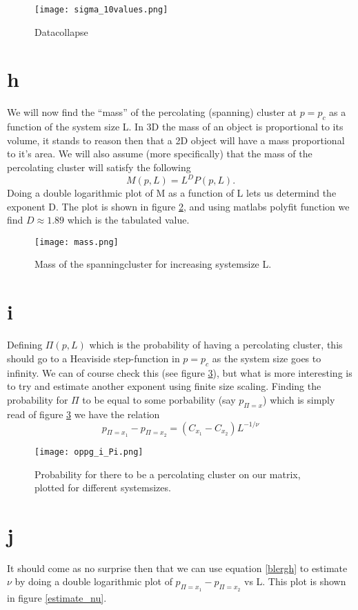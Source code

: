 \documentclass[a4paper,english, 10pt, twoside]{article}
\begin{document}
\begin{figure}[H]
 \centering
 \texttt{[image: sigma\_10values.png]}
 \caption{Datacollapse}
 \label{sigma}
\end{figure}

\section{h}
We will now find the ``mass'' of the percolating (spanning) cluster at $p = p_c$ as a function of the system size L. 
In 3D the mass of an object is proportional to its volume, it stands to reason then that a 2D object will have a mass 
proportional to it's area. We will also assume (more specifically) that the mass of the percolating cluster will 
satisfy the following
$$
M(p,L) = L^D P(p,L).
$$
Doing a double logarithmic plot of M as a function of L lets us determind the exponent D. The plot is shown in 
figure \ref{mass_D}, and using matlabs polyfit function we find $D \approx 1.89$ which is the tabulated value.
\begin{figure}[H]
 \centering
 \texttt{[image: mass.png]}
 \caption{Mass of the spanningcluster for increasing systemsize L.}
 \label{mass_D}
\end{figure}

\section{i}

Defining $\Pi(p,L)$ which is the probability of having a percolating cluster, this should go to a Heaviside 
step-function in $p = p_c$ as the system size goes to infinity. We can of course check this (see figure \ref{Pi}), 
but what is more interesting is to try and estimate another exponent using finite size scaling. Finding the probability 
for $\Pi$ to be equal to some porbability (say $p_{\Pi = x}$) which is simply read of figure \ref{Pi} we have the 
relation 
\begin{equation}\label{blergh}
 p_{\Pi = x_1} - p_{\Pi = x_2} = (C_{x_1} - C_{x_2})L^{-1/\nu}
\end{equation}

\begin{figure}[H]
 \centering
 \texttt{[image: oppg\_i\_Pi.png]}
 \caption{Probability for there to be a percolating cluster on our matrix, plotted for different systemsizes.}
 \label{Pi}
\end{figure}

\section{j}
It should come as no surprise then that we can use equation \ref{blergh} to estimate $\nu$ by doing a double 
logarithmic plot of $p_{\Pi = x_1} - p_{\Pi = x_2}$ vs L. This plot is shown in figure \ref{estimate_nu}.
\end{document}
